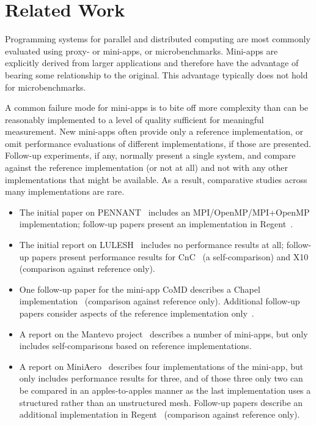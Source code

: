 \section{Related Work}
\label{sec:related-work}

Programming systems for parallel and distributed computing are most
commonly evaluated using proxy- or mini-apps, or
microbenchmarks. Mini-apps are explicitly derived from larger
applications and therefore have the advantage of bearing some
relationship to the original. This advantage typically does not hold
for microbenchmarks.

A common failure mode for mini-apps is to bite off more complexity
than can be reasonably implemented to a level of quality sufficient
for meaningful measurement. New mini-apps often provide only a
reference implementation, or omit performance evaluations of different
implementations, if those are presented. Follow-up experiments, if
any, normally present a single system, and compare against the
reference implementation (or not at all) and not with any other
implementations that might be available. As a result, comparative
studies across many implementations are rare.

\begin{itemize}

\item
The initial paper on PENNANT~\cite{PENNANT} includes an MPI/OpenMP/MPI+OpenMP
implementation; follow-up papers present an implementation in
Regent~\cite{Regent15, ControlReplication17, LegionTracing18}.

\item
The initial report on LULESH~\cite{LULESH12} includes no performance
results at all; follow-up papers present performance results for
CnC~\cite{LULESHCNC15} (a self-comparison) and X10~\cite{LULESHX1015}
(comparison against reference only).

\item
One follow-up paper for the mini-app CoMD describes a Chapel
implementation~\cite{CoMDChapel16} (comparison against reference
only). Additional follow-up papers consider aspects of the reference
implementation only~\cite{CoMDLoadImbalance17,
  CoMDThreadedModels14}.

\item
A report on the Mantevo project~\cite{Mantevo09} describes a number of
mini-apps, but only includes self-comparisons based on reference
implementations.

\item
A report on MiniAero~\cite{SandiaReportManyTaskRuntimes15} describes
four implementations of the mini-app, but only includes performance
results for three, and of those three only two can be compared in an
apples-to-apples manner as the last implementation uses a structured
rather than an unstructured mesh. Follow-up papers describe an
additional implementation in Regent~\cite{Regent15,
  ControlReplication17, LegionTracing18} (comparison against reference
only).

\end{itemize}

